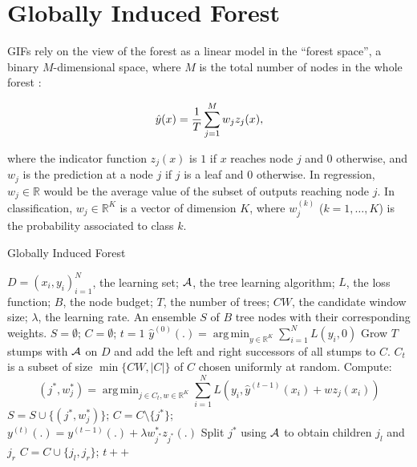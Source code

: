 \documentclass{article}
\DeclareMathOperator*{\argmin}{arg\,min}
\begin{document}
\section{Globally Induced Forest}
\label{sec:gif}

GIFs rely on the view of the forest as a linear model in the ``forest space'', 
a binary $M$-dimensional space, where $M$ is the total number of nodes in the 
whole forest \cite{l1basedcomp}:

\begin{equation}\label{eq:fs}
\vspace{-1em}
\hat{y}(x) =  \frac{1}{T} \sum_{j=1}^{M} w_j z_j(x),
\end{equation}

where the indicator function $z_j(x)$ is $1$ if $x$ reaches node $j$
and $0$ otherwise, and $w_j$ is the prediction at a node $j$ if $j$ is
a leaf and $0$ otherwise. In regression, $w_j \in \mathbb{R}$ would be the 
average value of the subset of outputs reaching node $j$. In classification, 
$w_j \in \mathbb{R}^K$ is a vector of dimension $K$, where $w_j^{(k)}$ 
($k=1,\ldots,K$) is the probability associated to class $k$.



\begin{algorithm}[tb]
   \caption{Globally Induced Forest}
   \label{alg:gif}
\begin{algorithmic}[1]
     $D= (x_i,y_i)_{i=1}^N$, the learning set; ${\cal 
    A}$, the tree learning algorithm; $L$, the loss function;  $B$, the node 
    budget; $T$, the number of trees; $CW$, the candidate window size; 
    $\lambda$, the learning rate.
     An ensemble $S$ of $B$ tree nodes with their 
    corresponding weights.
    \STATE $S=\emptyset$; $C=\emptyset$; $t=1$
    \STATE $\hat{y}^{(0)}(.)= \argmin_{y \in \mathbb{R}^K} \sum_{i=1}^{N} 
    L(y_i, 0)$
    \STATE Grow $T$ stumps with ${\cal A}$ on $D$ and add the left and right 
    successors of all stumps to  $C$.    
    \REPEAT
        \STATE $C_t$ is a subset of size $\min\{CW, |C|\}$ of $C$ chosen 
        uniformly at random.
        \STATE Compute:
            \vspace{-1.5em}
            \begin{equation*}
            (j^*,w^*_j)=\argmin_{j\in C_t, w\in \mathbb{R}^K} 
            \sum_{i=1}^{N} L \left(y_i, \hat{y}^{(t-1)}(x_i) + w z_j(x_i) 
            \right)
            \end{equation*}
            \vspace{-1em}
        \STATE $S=S\cup\{(j^*,w^*_j)\}$; $C=C\setminus\{j^*\}$; \\
            $y^{(t)}(.)=y^{(t-1)}(.)+\lambda w^*_{j^*} z_{j^*}(.)$
        \STATE Split $j^*$ using ${\cal A}$ to obtain children $j_l$ and $j_r$
        \STATE $C=C\cup\{j_l,j_r\}$; $t++$
\end{algorithmic}
\end{algorithm}
\end{document}
